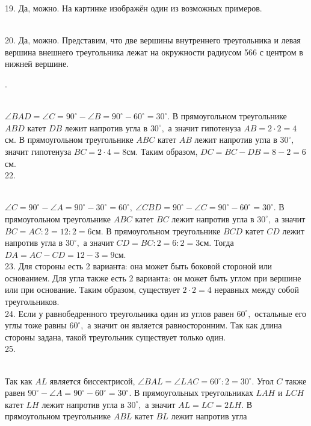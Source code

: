 19. Да, можно. На картинке изображён один из возможных примеров.
\begin{figure}[ht!]
\end{figure}\\
20. Да, можно. Представим, что две вершины внутреннего треугольника и левая вершина внешнего треугольника лежат на окружности радиусом 566 с центром в нижней вершине.
\begin{figure}[ht!]
\end{figure}\newpage{}. \begin{figure}[ht!]
\end{figure}\\
$\angle BAD=\angle C=90^\circ-\angle B=90^\circ-60^\circ=30^\circ.$ В прямоугольном треугольнике $ABD$ катет $DB$ лежит напротив угла в $30^\circ,$ а значит гипотенуза $AB=2\cdot2=4$см. В прямоугольном треугольнике $ABC$ катет $AB$ лежит напротив угла в $30^\circ,$ значит гипотенуза $BC=2\cdot4=8$см. Таким образом, $DC=BC-DB=8-2=6$см.\\
22. \begin{figure}[ht!]
\end{figure}\\
$\angle C=90^\circ-\angle A=90^\circ-30^\circ=60^\circ,\ \angle CBD=90^\circ-\angle C=90^\circ-60^\circ=30^\circ.$ В прямоугольном треугольнике $ABC$ катет $BC$ лежит напротив угла в $30^\circ,$ а значит $BC=AC:2=12:2=6$см. В прямоугольном треугольнике $BCD$ катет $CD$ лежит напротив угла в $30^\circ,$ а значит $CD=BC:2=6:2=3$см. Тогда $DA=AC-CD=12-3=9$см.\\
23. Для стороны есть 2 варианта: она может быть боковой стороной или основанием. Для угла также есть 2 варианта: он может быть углом при вершине или при основание. Таким образом, существует $2\cdot2=4$ неравных между собой треугольников.\\
24. Если у равнобедренного треугольника один из углов равен $60^\circ,$ остальные его углы тоже равны $60^\circ,$ а значит он является равносторонним. Так как длина стороны задана, такой треугольник существует только один.\\
25. \begin{figure}[ht!]
\end{figure}\\
Так как $AL$ является биссектрисой, $\angle BAL=\angle LAC=60^\circ:2=30^\circ.$ Угол $C$ также равен $90^\circ-\angle A=90^\circ-60^\circ=30^\circ.$ В прямоугольных треугольниках $LAH$ и $LCH$ катет $LH$ лежит напротив угла в $30^\circ,$ а значит $AL=LC=2LH.$ В прямоугольном треугольнике $ABL$ катет $BL$ лежит напротив угла
